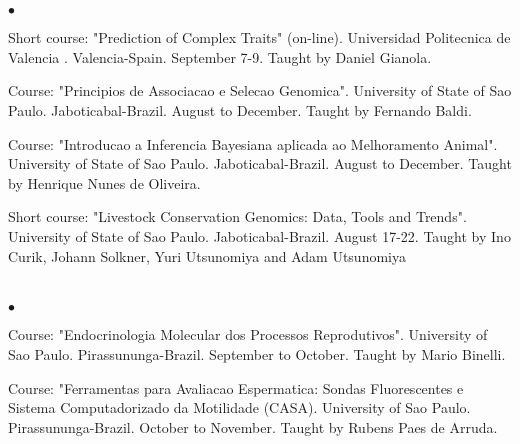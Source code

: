 \documentclass[margin,line,10pt]{res}
\newenvironment{list2}{
  \begin{list}{$\bullet$}{%
      \setlength{\itemsep}{0in}
      \setlength{\parsep}{0in} \setlength{\parskip}{0in}
      \setlength{\topsep}{0in} \setlength{\partopsep}{0in} 
      \setlength{\leftmargin}{0.2in}}}{\end{list}}
\begin{document}
\begin{resume}
\section{}

\begin{list2}
  \item Short course: "Prediction of Complex Traits" (on-line). Universidad Politecnica de Valencia . Valencia-Spain. September 7-9. Taught by Daniel Gianola.
  \vspace{0.5cm}
  \item Course: "Principios de Associacao e Selecao Genomica". University of State of Sao Paulo. Jaboticabal-Brazil. August to December. Taught by Fernando Baldi.
  \vspace{0.5cm}
  \item Course: "Introducao a Inferencia Bayesiana aplicada ao Melhoramento Animal". University of State of Sao Paulo. Jaboticabal-Brazil. August to December. Taught by Henrique Nunes de Oliveira.
  \vspace{0.5cm}

  \item Short course: "Livestock Conservation Genomics: Data, Tools and Trends". University of State of Sao Paulo. Jaboticabal-Brazil. August 17-22. Taught by Ino Curik, Johann Solkner, Yuri Utsunomiya and Adam Utsunomiya
  \vspace{0.5cm}
\end{list2}  
\vspace{0.5cm}

\section{}

\begin{list2}
\item Course: "Endocrinologia Molecular dos Processos Reprodutivos". University of Sao Paulo. Pirassununga-Brazil. September to October.
Taught by Mario Binelli.
\vspace{0.5cm}
\item Course: "Ferramentas para Avaliacao Espermatica: Sondas Fluorescentes e Sistema Computadorizado da Motilidade (CASA). University of Sao Paulo. Pirassununga-Brazil. October to November.
Taught by Rubens Paes de Arruda.
\end{list2}  
\vspace{0.5cm}

\section{}


\end{resume}
\end{document}
